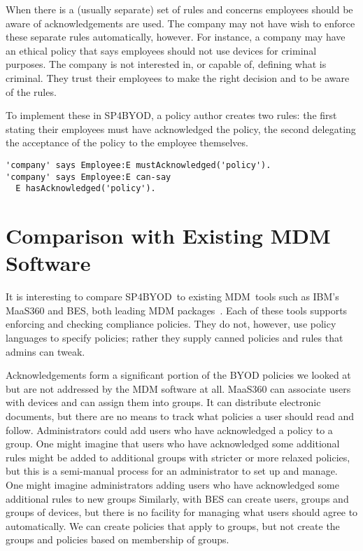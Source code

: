 \documentclass{llncs}
\newcommand{\AppPAL}[0]{SP4BYOD}
\begin{document}
When there is a (usually separate) set of rules and concerns employees should be aware of acknowledgements are used.
The company may not have wish to enforce these separate rules automatically, however.
For instance, a company may have an ethical policy that says employees should not use devices for criminal purposes.
The company is not interested in, or capable of, defining what is criminal.
They trust their employees to make the right decision and to be aware of the rules.

To implement these in \AppPAL, a policy author creates two rules: 
  the first stating their employees must have acknowledged the policy,
  the second delegating the acceptance of the policy to the employee themselves.
\begin{lstlisting}
'company' says Employee:E mustAcknowledged('policy').
'company' says Employee:E can-say
  E hasAcknowledged('policy').
\end{lstlisting}

\section{Comparison with Existing MDM Software}

It is interesting to compare \AppPAL~to existing MDM~tools such as IBM's MaaS360 and \ac{BES}, both leading MDM packages~\cite{rob_smith_magic_2016}.
Each of these tools supports enforcing and checking compliance policies. 
They do not, however, use policy languages to specify policies; rather they supply canned policies and rules that admins can tweak.

Acknowledgements form a significant portion of the BYOD policies we looked at but are not addressed by the MDM software at all.
MaaS360 can associate users with devices and can assign them into groups.
It can distribute electronic documents, but there are no means to track what policies a user should read and follow.
Administrators could add users who have acknowledged a policy to a group.
One might imagine that users who have acknowledged some additional rules might be added to additional groups with stricter or more relaxed policies, but this is a semi-manual process for an administrator to set up and manage.
One might imagine administrators adding users who have acknowledged some additional rules to new groups
Similarly, with \ac{BES} can create users, groups and groups of devices, but there is no facility for managing what users should agree to automatically.
We can create policies that apply to groups, but not create the groups and policies based on membership of groups.
\end{document}
